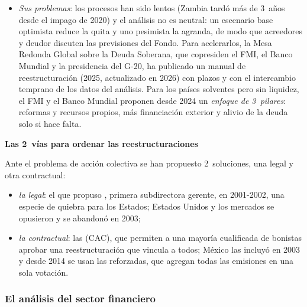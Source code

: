 \documentclass[11pt]{article}
\begin{document}
\begin{itemize}
\item \emph{Sus problemas}: los procesos han sido lentos (Zambia tardó más de 3~años desde el impago de 2020) y el análisis no es neutral: un escenario base optimista reduce la quita y uno pesimista la agranda, de modo que acreedores y deudor discuten las previsiones del Fondo. Para acelerarlos, la Mesa Redonda Global sobre la Deuda Soberana, que copresiden el FMI, el Banco Mundial y la presidencia del G-20, ha publicado un manual de reestructuración (2025, actualizado en 2026) con plazos y con el intercambio temprano de los datos del análisis. Para los países solventes pero sin liquidez, el FMI y el Banco Mundial proponen desde 2024 un \emph{enfoque de 3~pilares}: reformas y recursos propios, más financiación exterior y alivio de la deuda solo si hace falta\nocite{FMIBM2024TresPilares}.
\end{itemize}

\begin{anotaciones}
\textbf{Las 2~vías para ordenar las reestructuraciones}

Ante el problema de acción colectiva se han propuesto 2~soluciones, una legal y otra contractual:
\begin{itemize}
\item \emph{la legal}: el  que propuso , primera subdirectora gerente, en 2001-2002, una especie de quiebra para los Estados; Estados Unidos y los mercados se opusieron y se abandonó en 2003\nocite{Krueger2002SDRM};
\item \emph{la contractual}: las  (CAC), que permiten a una mayoría cualificada de bonistas aprobar una reestructuración que vincula a todos; México las incluyó en 2003 y desde 2014 se usan las reforzadas, que agregan todas las emisiones en una sola votación.
\end{itemize}
\end{anotaciones}

\subsubsection{El análisis del sector financiero}\label{sec:sector-financiero}
\end{document}
